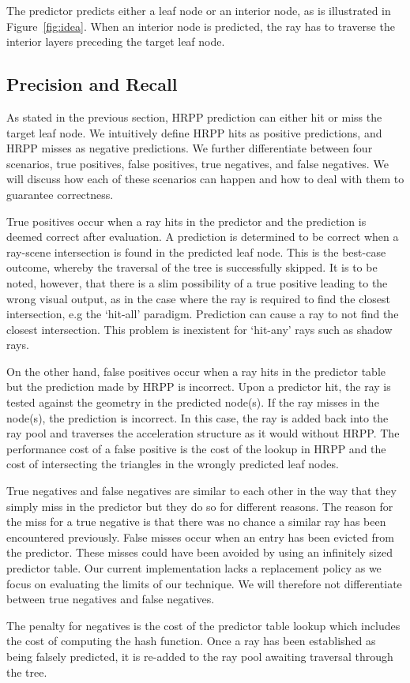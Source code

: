 The predictor predicts either a leaf node or an interior node, as is illustrated in Figure~\ref{fig:idea}. When an interior node is predicted, the ray has to traverse the interior layers preceding the target leaf node.

\subsection{Precision and Recall}
As stated in the previous section, HRPP prediction can either hit or miss the target leaf node. We intuitively define HRPP hits as positive predictions, and HRPP misses as negative predictions. We further differentiate between four scenarios, true positives, false positives, true negatives, and false negatives. We will discuss how each of these scenarios can happen and how to deal with them to guarantee correctness.

True positives occur when a ray hits in the predictor and the prediction is deemed correct after evaluation. A prediction is determined to be correct when a ray-scene intersection is found in the predicted leaf node.  This is the best-case outcome, whereby the traversal of the tree is successfully skipped. It is to be noted, however, that there is a slim possibility of a true positive leading to the wrong visual output, as in the case where the ray is required to find the closest intersection, e.g the `hit-all' paradigm. Prediction can cause a ray to not find the closest intersection. This problem is inexistent for `hit-any' rays such as shadow rays. 

On the other hand, false positives occur when a ray hits in the predictor table but the prediction made by HRPP is incorrect. Upon a predictor hit, the ray is tested against the geometry in the predicted node(s). If the ray misses in the node(s), the prediction is incorrect. In this case, the ray is added back into the ray pool and traverses the acceleration structure as it would without HRPP. The performance cost of a false positive is the cost of the lookup in HRPP and the cost of intersecting the triangles in the wrongly predicted leaf nodes. 

True negatives and false negatives are similar to each other in the way that they simply miss in the predictor but they do so for different reasons. The reason for the miss for a true negative is that there was no chance a similar ray has been encountered previously. False misses occur when an entry has been evicted from the predictor. These misses could have been avoided by using an infinitely sized predictor table. Our current implementation lacks a replacement policy as we focus on evaluating the limits of our technique. We will therefore not differentiate between true negatives and false negatives. 

The penalty for negatives is the cost of the predictor table lookup which includes the cost of computing the hash function. Once a ray has been established as being falsely predicted, it is re-added to the ray pool awaiting traversal through the tree.
